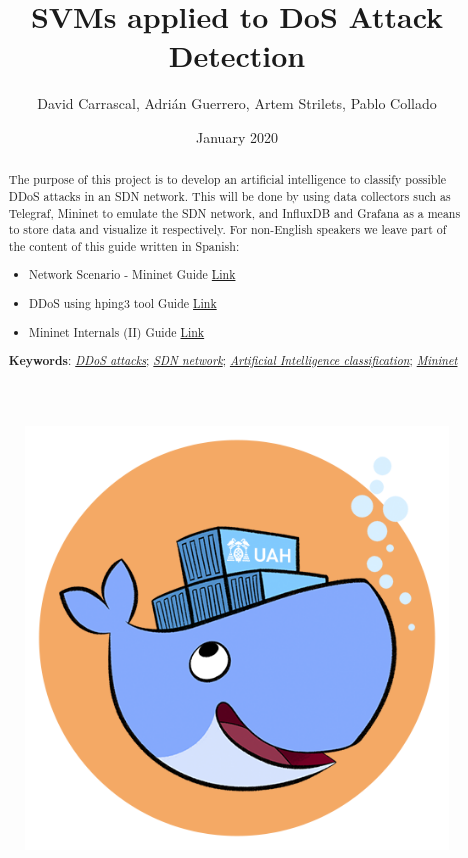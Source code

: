 \documentclass[12pt]{article}
\title{SVMs applied to DoS Attack Detection}
\author{David Carrascal, Adrián Guerrero, Artem Strilets, Pablo Collado}
\date{January 2020}
\newcommand{\newpar} {
    \vskip 1cm
}
\begin{document}
\begin{titlepage}
	\maketitle
	\newpar
	\newpar
		\begin{figure}[!htb]
		\centering
		\includegraphics[width=0.5\linewidth]{logo_project.png}
	\end{figure}
\end{titlepage}



\begin{abstract}
	The purpose of this project is to develop an artificial intelligence to classify possible DDoS attacks in an SDN network. This will be done by using data collectors such as Telegraf, Mininet to emulate the SDN network, and InfluxDB and Grafana as a means to store data and visualize it respectively. For non-English speakers we leave part of the content of this guide written in Spanish:

	\begin{itemize}
		\item Network Scenario - Mininet Guide \href{https://hackmd.io/@davidcawork/r1fZC-nRS}{Link}
		\item DDoS using hping3 tool Guide \href{https://hackmd.io/@davidcawork/HJ_D7jA0r}{Link}
		\item Mininet Internals (II) Guide \href{https://hackmd.io/@davidcawork/SyrwHoNJL}{Link}
	\end{itemize}

	\textbf{Keywords}: \href{https://www.digitalattackmap.com/}{\textit{DDoS attacks}}; \href{https://www.opennetworking.org/sdn-definition}{\textit{SDN network}}; \href{https://www.sciencedirect.com/science/article/abs/pii/016974399500050X}{\textit{Artificial Intelligence classification}}; \href{https://mininet.org}{\textit{Mininet}}
\end{abstract}
\end{document}

